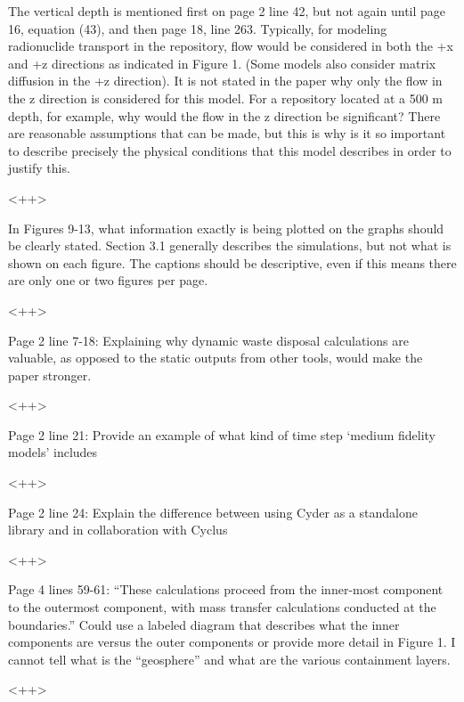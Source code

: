 \documentclass[answers,12pt]{exam}
\begin{document}
\begin{questions}
\question The  vertical  depth  is  mentioned  first  on  page  2  line  42,  but  not  again  until  page  16,  equation  (43),  and  then 
page  18,  line  263.  Typically,  for  modeling  radionuclide  transport  in  the repository, flow would be considered 
in  both  the  +x  and  +z  directions as indicated in Figure 1. (Some models also consider matrix diffusion in the 
+z  direction).  It  is  not  stated  in  the  paper  why  only  the  flow  in  the  z  direction  is  considered  for this model. 
For  a  repository  located  at  a  500  m  depth,  for  example, why would the flow in the z direction be significant? 
There  are reasonable assumptions that can be made, but this is why is it so important to describe precisely the 
physical conditions that this model describes in order to justify this.  
\begin{solution}
<++>
\end{solution} 

 
\question In  Figures  9-13,  what  information  exactly  is  being  plotted  on  the  graphs should be clearly stated. Section 3.1 
generally  describes  the  simulations, but not what is shown on each figure. The captions should be descriptive, 
even if this means there are only one or two figures per page.  
\begin{solution}
<++>
\end{solution} 
 
\question Page  2  line  7-18:  Explaining  why  dynamic  waste  disposal  calculations  are  valuable,  as  opposed  to  the 
static outputs from other tools, would make the paper stronger. 
\begin{solution}
<++>
\end{solution} 

\question Page 2 line 21:  Provide an example of what kind of time step `medium fidelity models' includes 
\begin{solution}
<++>
\end{solution} 
 
\question Page  2  line  24:  Explain  the  difference  between  using  Cyder  as  a  standalone  library  and  in  collaboration  with Cyclus 
\begin{solution}
<++>
\end{solution} 
 
\question Page  4  lines  59-61:  ``These  calculations  proceed  from  the  inner-most  component  to  the  outermost 
component,  with  mass  transfer  calculations  conducted  at  the  boundaries.'' Could  use  a  labeled  diagram 
that  describes  what  the  inner  components  are  versus  the  outer  components  or  provide  more  detail  in 
Figure 1. I cannot tell what is the ``geosphere'' and what are the various containment layers. 
\begin{solution}
<++>
\end{solution} 
 

\end{questions}
\end{document}
